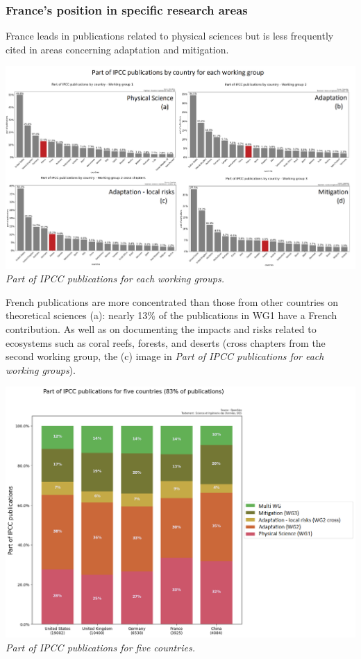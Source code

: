 \documentclass[
]{article}
\begin{document}
\hypertarget{frances-position-in-specific-research-areas}{%
\subsubsection{France's position in specific research
areas}\label{frances-position-in-specific-research-areas}}

France leads in publications related to physical sciences but is less
frequently cited in areas concerning adaptation and mitigation.

\includegraphics{./images/teds_ipcc_wg_ens_part.png} \emph{Part of IPCC
publications for each working groups.}

French publications are more concentrated than those from other
countries on theoretical sciences (a): nearly 13\% of the publications
in WG1 have a French contribution. As well as on documenting the impacts
and risks related to ecosystems such as coral reefs, forests, and
deserts (cross chapters from the second working group, the (c) image in
\emph{Part of IPCC publications for each working groups}).

\includegraphics{./images/teds_ipcc_5countries_interfaces.png}
\emph{Part of IPCC publications for five countries.}
\end{document}
